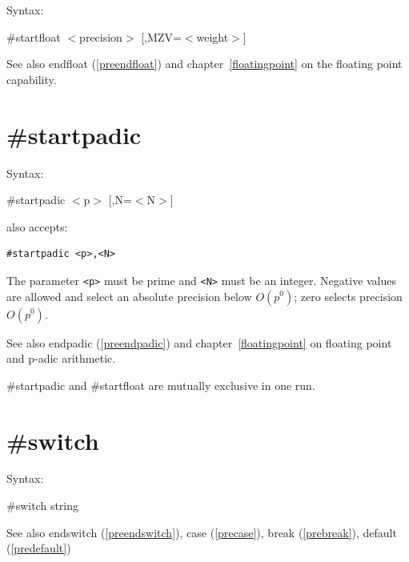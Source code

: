 \noindent Syntax:

\#startfloat $<$precision$>$ [,MZV=$<$weight$>$]

\noindent See also endfloat (\ref{preendfloat}) and chapter~\ref{floatingpoint} on the floating point capability.
 

\section{\#startpadic}
\label{prestartpadic}

\noindent Syntax:

\#startpadic $<$p$>$ [,N=$<$N$>$]

\noindent \FORM{} also accepts:
\begin{verbatim}
#startpadic <p>,<N>
\end{verbatim}
The parameter \texttt{<p>} must be prime and \texttt{<N>} must be an integer.
Negative values are allowed and select an absolute precision below $O(p^0)$;
zero selects precision $O(p^0)$.

\noindent See also endpadic (\ref{preendpadic}) and chapter~\ref{floatingpoint}
on floating point and p-adic arithmetic.

\noindent \#startpadic and \#startfloat are mutually exclusive in one run.
 

\section{\#switch}
\label{preswitch}

\noindent Syntax:

\#switch string
 
\noindent See also endswitch (\ref{preendswitch}),
        case (\ref{precase}),
        break (\ref{prebreak}),
        default (\ref{predefault})

